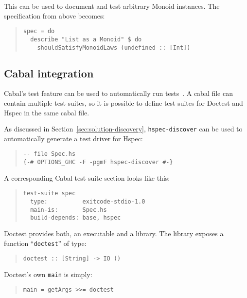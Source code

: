 \documentclass[preprint]{sigplanconf}
\begin{document}
\noindent This can be used to document and test arbitrary Monoid
instances.
The specification from above becomes:

\begin{quote}
\small
\begin{verbatim}
spec = do
  describe "List as a Monoid" $ do
    shouldSatisfyMonoidLaws (undefined :: [Int])
\end{verbatim}
\end{quote}

\subsection{Cabal integration}

\noindent Cabal's test feature can be used to automatically run tests~\cite{cabal}.  A cabal
file can contain multiple test suites, so it is possible to define test suites
for Doctest and Hspec in the same cabal file.

As discussed in Section~\ref{sec:solution-discovery},
{\tt hspec-discover} can be used to automatically generate a test
driver for Hspec:

\begin{quote}
\small
\begin{verbatim}
-- file Spec.hs
{-# OPTIONS_GHC -F -pgmF hspec-discover #-}
\end{verbatim}
\end{quote}

\noindent A corresponding Cabal test suite section looks like this:

\begin{quote}
\small
\begin{verbatim}
test-suite spec
  type:          exitcode-stdio-1.0
  main-is:       Spec.hs
  build-depends: base, hspec
\end{verbatim}
\end{quote}

\noindent Doctest provides both, an executable and a library.  The library
exposes a function ``{\tt doctest}'' of type:


\begin{quote}
\small
\begin{verbatim}
doctest :: [String] -> IO ()
\end{verbatim}
\end{quote}

\noindent Doctest's own {\tt main} is simply:
\begin{quote}
\small
\begin{verbatim}
main = getArgs >>= doctest
\end{verbatim}
\end{quote}
\end{document}
